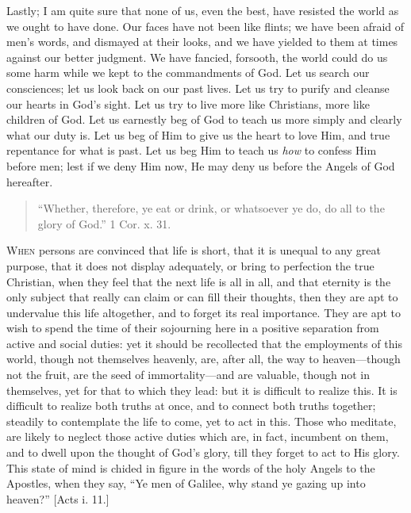 Lastly; I am quite sure that none of us, even the best, have
resisted the world as we ought to have done. Our faces have not been
like flints; we have been afraid of men's words, and dismayed at their
looks, and we have yielded to them at times against our better
judgment. We have fancied, forsooth, the world could do us some harm
while we kept to the commandments of God. Let us search our
consciences; let us look back on our past lives. Let us try to purify
and cleanse our hearts in God's sight. Let us try to live more like
Christians, more like children of God. Let us earnestly beg of God to
teach us more simply and clearly what our duty is. Let us beg of Him
to give us the heart to love Him, and true repentance for what is
past. Let us beg Him to teach us \emph{how} to confess Him before men;
lest if we deny Him now, He may deny us before the Angels of God
hereafter.


\begin{quote}

``Whether, therefore, ye eat or drink, or whatsoever ye do,
do all to the glory of God.'' 1 Cor. x. 31.

\end{quote}

W\textsc{hen} persons are convinced that life is short, that it is unequal
to any great purpose, that it does not display adequately, or bring to
perfection the true Christian, when they feel that the next life is
all in all, and that eternity is the only subject that really can
claim or can fill their thoughts, then they are apt to undervalue this
life altogether, and to forget its real importance. They are apt to
wish to spend the time of their sojourning here in a positive
separation from active and social duties: yet it should be recollected
that the employments of this world, though not themselves heavenly,
are, after all, the way to heaven—though not the fruit, are the seed
of immortality—and are valuable, though not in themselves, yet for
that to which they lead: but it is difficult to realize this. It is
difficult to realize both truths at once, and to connect both truths
together; steadily to contemplate the life to come, yet to act in
this. Those who meditate, are likely to neglect those active duties
which are, in fact, incumbent on them, and to dwell upon the thought
of God's glory, till they forget to act to His glory. This state of
mind is chided in figure in the words of the holy Angels to the
Apostles, when they say, ``Ye men of Galilee, why stand ye gazing
up into heaven?'' [Acts i. 11.]

